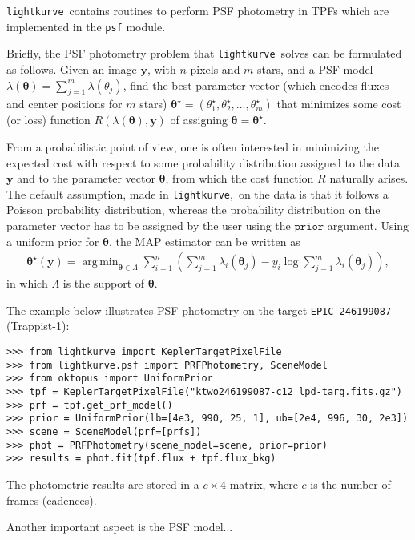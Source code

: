 \documentclass[twocolumn]{aastex62}
\newcommand{\lightkurve}{\texttt{lightkurve}}
\DeclareMathOperator*{\argmin}{arg\,min}
\begin{document}
\lightkurve ~contains routines to perform PSF photometry in TPFs
which are implemented in the \texttt{psf} module.

Briefly, the PSF photometry problem that \lightkurve~solves can be formulated as
follows. Given an image $\bm{y}$, with $n$ pixels and $m$ stars, and a PSF model
$\lambda(\bm{\theta}) = \sum_{j=1}^{m} \lambda({\theta}_j)$,
find the best parameter vector (which encodes fluxes and center positions for $m$
stars) $\bm{\theta}^{\star} = (\theta_1^{\star}, \theta_2^{\star}, ..., \theta_m^{\star})$
that minimizes some cost (or loss) function $R(\lambda(\bm{\theta}), \bm{y})$
of assigning $\bm{\theta} = \bm{\theta}^{\star}$.

From a probabilistic point of view, one is often interested in minimizing the
expected cost with respect to some probability distribution assigned to the data
$\bm{y}$ and to the parameter vector $\bm{\theta}$, from which the cost function
$R$ naturally arises. The default assumption, made in \lightkurve,~on the data is
that it follows a Poisson probability distribution, whereas the probability
distribution on the parameter vector has to be assigned by the user using the $\texttt{prior}$
argument. Using a uniform prior for $\bm{\theta}$, the MAP estimator can be written
as
\begin{align}
    \bm{\theta}^{\star}(\bm{y}) = \argmin_{\bm{\theta} \in \Lambda} \sum_{i=1}^{n}
    \left(\sum_{j=1}^{m}\lambda_i(\bm{\theta}_j) - y_i\log\sum_{j=1}^{m}\lambda_i(\bm{\theta}_j)\right),
\end{align}
in which $\Lambda$ is the support of $\bm{\theta}$.

The example below illustrates PSF photometry on the target \texttt{EPIC 246199087}
(Trappist-1):

\begin{verbatim}
>>> from lightkurve import KeplerTargetPixelFile
>>> from lightkurve.psf import PRFPhotometry, SceneModel
>>> from oktopus import UniformPrior
>>> tpf = KeplerTargetPixelFile("ktwo246199087-c12_lpd-targ.fits.gz")
>>> prf = tpf.get_prf_model()
>>> prior = UniformPrior(lb=[4e3, 990, 25, 1], ub=[2e4, 996, 30, 2e3])
>>> scene = SceneModel(prf=[prfs])
>>> phot = PRFPhotometry(scene_model=scene, prior=prior)
>>> results = phot.fit(tpf.flux + tpf.flux_bkg)
\end{verbatim}

The photometric results are stored in a $c \times 4$ matrix, where $c$ is the
number of frames (cadences).

Another important aspect is the PSF model...
\end{document}
